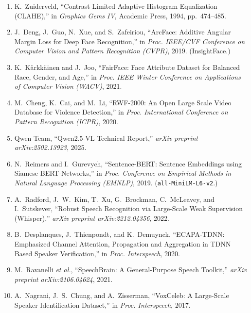 \documentclass[12pt]{report}
\begin{document}
\begin{enumerate}
    \item K.~Zuiderveld, ``Contrast Limited Adaptive Histogram Equalization (CLAHE),'' in \textit{Graphics Gems IV}, Academic Press, 1994, pp.~474--485.

    \item J.~Deng, J.~Guo, N.~Xue, and S.~Zafeiriou, ``ArcFace: Additive Angular Margin Loss for Deep Face Recognition,'' in \textit{Proc. IEEE/CVF Conference on Computer Vision and Pattern Recognition (CVPR)}, 2019. (InsightFace.)

    \item K.~K\"arkk\"ainen and J.~Joo, ``FairFace: Face Attribute Dataset for Balanced Race, Gender, and Age,'' in \textit{Proc. IEEE Winter Conference on Applications of Computer Vision (WACV)}, 2021.

    \item M.~Cheng, K.~Cai, and M.~Li, ``RWF-2000: An Open Large Scale Video Database for Violence Detection,'' in \textit{Proc. International Conference on Pattern Recognition (ICPR)}, 2020.

    \item Qwen Team, ``Qwen2.5-VL Technical Report,'' \textit{arXiv preprint arXiv:2502.13923}, 2025.

    \item N.~Reimers and I.~Gurevych, ``Sentence-BERT: Sentence Embeddings using Siamese BERT-Networks,'' in \textit{Proc. Conference on Empirical Methods in Natural Language Processing (EMNLP)}, 2019. (\texttt{all-MiniLM-L6-v2}.)

    \item A.~Radford, J.~W.~Kim, T.~Xu, G.~Brockman, C.~McLeavey, and I.~Sutskever, ``Robust Speech Recognition via Large-Scale Weak Supervision (Whisper),'' \textit{arXiv preprint arXiv:2212.04356}, 2022.

    \item B.~Desplanques, J.~Thienpondt, and K.~Demuynck, ``ECAPA-TDNN: Emphasized Channel Attention, Propagation and Aggregation in TDNN Based Speaker Verification,'' in \textit{Proc. Interspeech}, 2020.

    \item M.~Ravanelli \textit{et al.}, ``SpeechBrain: A General-Purpose Speech Toolkit,'' \textit{arXiv preprint arXiv:2106.04624}, 2021.

    \item A.~Nagrani, J.~S.~Chung, and A.~Zisserman, ``VoxCeleb: A Large-Scale Speaker Identification Dataset,'' in \textit{Proc. Interspeech}, 2017.


\end{enumerate}
\end{document}
